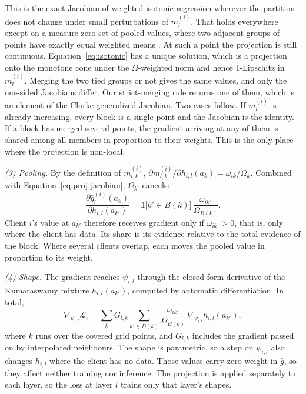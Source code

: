 \documentclass[11pt]{article}
\begin{document}
This is the exact Jacobian of weighted isotonic regression wherever the partition does not change under small perturbations of $m^{(i)}_l$.
That holds everywhere except on a measure-zero set of pooled values, where two adjacent groups of points have exactly equal weighted means \citep[cf.\ the unweighted case in][]{blondel-etal-2020-fast}.
At such a point the projection is still continuous.
Equation~\ref{eq:isotonic} has a unique solution, which is a projection onto the monotone cone under the $\Omega$-weighted norm and hence 1-Lipschitz in $m^{(i)}_l$.
Merging the two tied groups or not gives the same values, and only the one-sided Jacobians differ.
Our strict-merging rule returns one of them, which is an element of the Clarke generalized Jacobian.
Two cases follow.
If $m^{(i)}_l$ is already increasing, every block is a single point and the Jacobian is the identity.
If a block has merged several points, the gradient arriving at any of them is shared among all members in proportion to their weights.
This is the only place where the projection is non-local.

\emph{(3) Pooling.}
By the definition of $m^{(i)}_{l,k}$, $\partial m^{(i)}_{l,k}/\partial h_{i,l}(a_k)=\omega_{ik}/\Omega_k$.
Combined with Equation~\ref{eq:proj-jacobian}, $\Omega_{k'}$ cancels:
\begin{equation}
  \frac{\partial \bar g^{(i)}_l(a_k)}{\partial h_{i,l}(a_{k'})} = \mathbb{1}\bigl[k'\in B(k)\bigr]\,\frac{\omega_{ik'}}{\Omega_{B(k)}} .
\end{equation}
Client $i$'s value at $a_{k'}$ therefore receives gradient only if $\omega_{ik'}>0$, that is, only where the client has data.
Its share is its evidence relative to the total evidence of the block.
Where several clients overlap, each moves the pooled value in proportion to its weight.

\emph{(4) Shape.}
The gradient reaches $\psi_{i,l}$ through the closed-form derivative of the Kumaraswamy mixture $h_{i,l}(a_{k'})$, computed by automatic differentiation.
In total,
\begin{equation}
  \nabla_{\psi_{i,l}}\mathcal{L}_i
  = \sum_{k} G_{l,k} \sum_{k'\in B(k)} \frac{\omega_{ik'}}{\Omega_{B(k)}}\,
    \nabla_{\psi_{i,l}} h_{i,l}(a_{k'}) ,
  \label{eq:aligned-grad}
\end{equation}
where $k$ runs over the covered grid points, and $G_{l,k}$ includes the gradient passed on by interpolated neighbours.
The shape is parametric, so a step on $\psi_{i,l}$ also changes $h_{i,l}$ where the client has no data.
Those values carry zero weight in $\bar g$, so they affect neither training nor inference.
The projection is applied separately to each layer, so the loss at layer $l$ trains only that layer's shapes.
\end{document}
